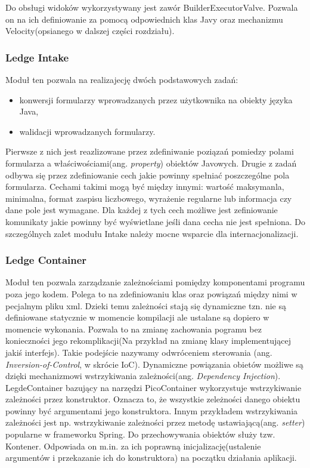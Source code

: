 Do obsługi widoków wykorzystywany jest zawór BuilderExecutorValve. Pozwala on na ich definiowanie za pomocą odpowiednich klas Javy oraz mechanizmu Velocity(opsianego w dalszej części rozdziału).

\subsubsection{Ledge Intake}
Moduł ten pozwala na realizajecję dwóch podstawowych zadań:
\begin{itemize}
	\item konwersji formularzy wprowadzanych przez użytkownika na obiekty języka Java,
	\item walidacji wprowadzanych formularzy.
\end{itemize}
Pierwsze z nich jest reazlizowane przez zdefiniwanie poziązań pomiedzy polami formularza a właściwościami(ang. \textit{property}) obiektów Javowych. Drugie z zadań odbywa się przez zdefiniowanie cech jakie powinny spełniać poszczególne pola formularza. Cechami takimi mogą być między innymi: wartość maksymanla, minimalna, format zaspisu liczbowego, wyrażenie regularne lub informacja czy dane pole jest wymagane. Dla każdej z tych cech możliwe jest zefiniowanie komunikaty jakie powinny być wyświetlane jeśli dana cecha nie jest spełniona. Do szczególnych zalet modułu Intake należy mocne wsparcie dla internacjonalizacji.

\subsubsection{Ledge Container}
Moduł ten pozwala zarządzanie zależnościami pomiędzy komponentami programu poza jego kodem. Polega to na zdefiniowaniu klas oraz powiązań między nimi w pecjalnym pliku xml. Dzieki temu zależności stają się dynamiczne tzn. nie są definiowane statycznie w momencie kompilacji ale ustalane są dopiero w momencie wykonania. Pozwala to na zmianę zachowania pogramu bez konieczności jego rekomplikacji(Na przykład na zmianę klasy implementującej jakiś interfejs). Takie podejście nazywamy odwróceniem sterowania (ang. \textit{Inversion-of-Control}, w skrócie IoC). Dynamiczne powiązania obietów możliwe są dzięki mechanizmowi wstrzykiwania zależności(ang. \textit{Dependency Injection}). LegdeContainer bazujący na narzędzi PicoContainer wykorzystuje wstrzykiwanie zależności przez konstruktor. Oznacza to, że wszystkie zeleżności danego obiektu powinny być argumentami jego konstruktora. Innym przykładem wstrzykiwania zależności jest np. wstrzykiwanie zależności przez metodę ustawiającą(ang. \textit{setter}) popularne w frameworku Spring. Do przechowywania obiektów służy tzw. Kontener. Odpowiada on m.in. za ich poprawną inicjalizację(ustalenie argumentów i przekazanie ich do konstruktora) na początku działania aplikacji.

